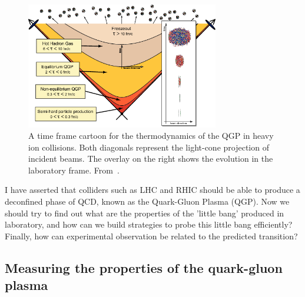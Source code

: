 \begin{figure}
\begin{center}
  \includegraphics[width=0.75\textwidth]{Chapters/pQCD/timescales.png}
 \caption{A time frame cartoon for the thermodynamics of the QGP in
   heavy ion collisions. Both
   diagonals represent the light-cone projection of incident
   beams. The overlay on the right shows the evolution in the
   laboratory frame. From~\cite{strickland_phase}.}
 \label{fig:timescales}
\end{center}
\end{figure}


I have asserted that colliders such as LHC and RHIC should be
able to produce a deconfined phase of QCD, known as the Quark-Gluon
Plasma (QGP). Now we should try to find out what are the properties of
the 'little bang' produced in laboratory, and how can we build
strategies to probe this little bang efficiently? Finally, how can
experimental observation be related to the predicted transition?

\subsection{Measuring the properties of the quark-gluon plasma}

